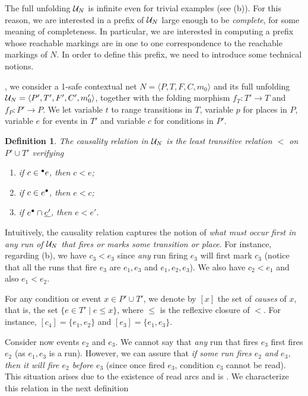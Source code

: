 \documentclass[11pt,a4paper]{article}
\newtheorem{definition}{Definition}
\begin{document}
The full unfolding $\mathcal{U}_{N}$ is infinite even for trivial examples (see
 (b)).  For this reason, we are interested in a prefix of $\mathcal{U}_{N}$ large enough to be \emph{complete}, for some meaning of completeness.  In
particular, we are interested in computing a prefix whose reachable markings
are in one to one correspondence to the reachable markings of $N$.  In order to
define this prefix, we need to introduce some technical notions.  

, we consider a 1-safe contextual net
$N = \langle P, T, F, C, m_0 \rangle$ and its full unfolding $\mathcal{U}_{N} = \langle
P', T', F', C', m'_0 \rangle$, together with the folding morphism $f_T : T' \to
T$ and $f_P : P' \to P$.  We let variable $t$ to range transitions in $T$,
variable $p$ for places in $P$, variable $e$ for events in $T'$ and variable
$c$ for conditions in $P'$.

\begin{definition}
\label{def:causality.relation}
The \emph{causality relation} in $\mathcal{U}_{N}$ is the least transitive relation $<$
on $P' \cup T'$ verifying

\begin{enumerate}
\item if $c \in {}^\bullet e$, then $c < e$;
\item if $c \in e^\bullet$, then $e < c$;
\item if $e^\bullet \cap \underline{e'}$, then $e < e'$.
\end{enumerate}
\end{definition}

Intuitively, the causality relation captures the notion of \textit{what must
occur first in \emph{any} run of $\mathcal{U}_{N}$ that fires or marks some transition
or place}.  For instance, regarding  (b), we have $c_3 < e_3$
since \emph{any} run firing $e_3$ will first mark $c_3$ (notice that all the
runs that fire $e_3$ are $e_1, e_3$ and $e_1, e_2, e_3$).  We also have $c_2 <
e_1$ and also $e_1 < e_2$.

For any condition or event $x \in P' \cup T'$, we denote by $[x]$ the set of
\emph{causes} of $x$, that is, the set $\{e \in T' \mid e \le x\}$, where $\le$
is the reflexive closure of $<$.  For instance, $[c_4] = \{e_1, e_2\}$ and
$[e_3] = \{e_1, e_3\}$.

Consider now events $e_2$ and $e_3$.  We cannot say that \emph{any} run that
fires $e_3$ first fires $e_2$ (as $e_1, e_3$ is a run).  However, we can assure
that \emph{if some run fires $e_2$ and $e_3$, then it will fire $e_2$ before
$e_3$} (since once fired $e_3$, condition $c_3$ cannot be read).  This
situation arises due to the existence of read arcs and is .  We characterize
this relation in the next definition
\end{document}
